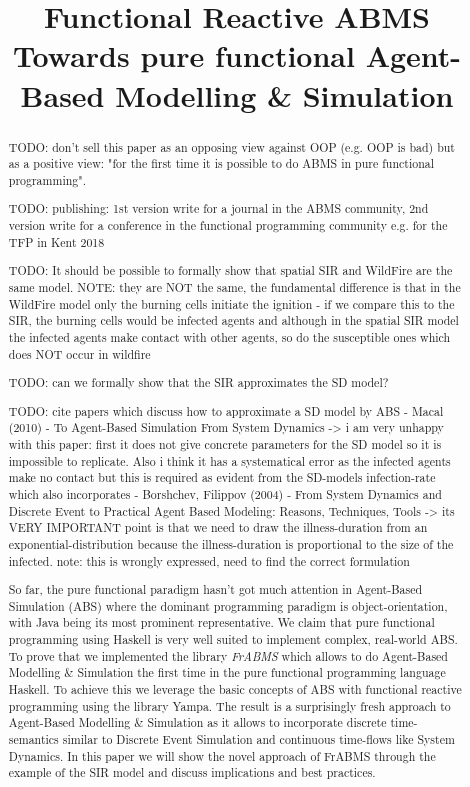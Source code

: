 \documentclass[10pt, conference]{../../templates/IEEEtran/IEEEtran}
\title{Functional Reactive ABMS\\{\subtitlefont Towards pure functional Agent-Based Modelling \& Simulation}}
\author{
	\IEEEauthorblockN{Jonathan Thaler}
	\IEEEauthorblockA{School of Computer Science\\
		University of Nottingham\\
		jonathan.thaler@nottingham.ac.uk}
		
	\and
		
	\IEEEauthorblockN{Peer-Olaf Siebers}
	\IEEEauthorblockA{School of Computer Science\\
		University of Nottingham\\
		peer-olaf.siebers@nottingham.ac.uk}
}
\begin{document}
\maketitle 

\begin{abstract}
TODO: don't sell this paper as an opposing view against OOP (e.g. OOP is bad) but as a positive view: "for the first time it is possible to do ABMS in pure functional programming".

TODO: publishing: 1st version write for a journal in the ABMS community, 2nd version write for a conference in the functional programming community e.g. for the TFP in Kent 2018

TODO: It should be possible to formally show that spatial SIR and WildFire are the same model. NOTE: they are NOT the same, the fundamental difference is that in the WildFire model only the burning cells initiate the ignition - if we compare this to the SIR, the burning cells would be infected agents and although in the spatial SIR model the infected agents make contact with other agents, so do the susceptible ones which does NOT occur in wildfire

TODO: can we formally show that the SIR approximates the SD model?

TODO: cite papers which discuss how to approximate a SD model by ABS
- Macal (2010) - To Agent-Based Simulation From System Dynamics 
	-> i am very unhappy with this paper: first it does not give concrete parameters for the SD model so it is impossible to replicate. Also i think it has a systematical error as the infected agents make no contact but this is required as evident from the SD-models infection-rate which also incorporates
- Borshchev, Filippov (2004) - From System Dynamics and Discrete Event to Practical Agent Based Modeling: Reasons, Techniques, Tools
	-> its VERY IMPORTANT point is that we need to draw the illness-duration from an exponential-distribution because the illness-duration is proportional to the size of the infected. note: this is wrongly expressed, need to find the correct formulation


So far, the pure functional paradigm hasn't got much attention in Agent-Based Simulation (ABS) where the dominant programming paradigm is object-orientation, with Java being its most prominent representative. We claim that pure functional programming using Haskell is very well suited to implement complex, real-world ABS. To prove that we implemented the library \textit{FrABMS} which allows to do Agent-Based Modelling \& Simulation the first time in the pure functional programming language Haskell. To achieve this we leverage the basic concepts of ABS with functional reactive programming using the library Yampa. The result is a surprisingly fresh approach to Agent-Based Modelling \& Simulation as it allows to incorporate discrete time-semantics similar to Discrete Event Simulation and continuous time-flows like System Dynamics. In this paper we will show the novel approach of FrABMS through the example of the SIR model and discuss implications and best practices.
\end{abstract}
\end{document}
